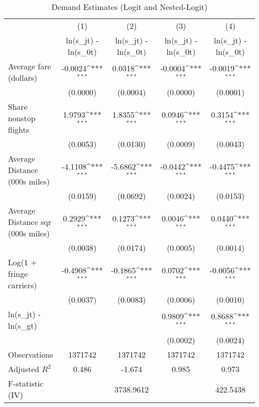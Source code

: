 \begin{table}[htbp]\centering
\def\sym#1{\ifmmode^{#1}\else\(^{#1}\)\fi}
\caption{Demand Estimates (Logit and Nested-Logit)}
\begin{tabular}{l*{4}{c}}
\toprule
                    &\multicolumn{1}{c}{(1)}&\multicolumn{1}{c}{(2)}&\multicolumn{1}{c}{(3)}&\multicolumn{1}{c}{(4)}\\
                    &\multicolumn{1}{c}{ln(s\_jt) - ln(s\_0t)}&\multicolumn{1}{c}{ln(s\_jt) - ln(s\_0t)}&\multicolumn{1}{c}{ln(s\_jt) - ln(s\_0t)}&\multicolumn{1}{c}{ln(s\_jt) - ln(s\_0t)}\\
\midrule
Average fare (dollars)&     -0.0024\sym{***}&      0.0318\sym{***}&     -0.0004\sym{***}&     -0.0019\sym{***}\\
                    &    (0.0000)         &    (0.0004)         &    (0.0000)         &    (0.0001)         \\
\addlinespace
Share nonstop flights &      1.9793\sym{***}&      1.8355\sym{***}&      0.0946\sym{***}&      0.3154\sym{***}\\
                    &    (0.0053)         &    (0.0130)         &    (0.0009)         &    (0.0043)         \\
\addlinespace
Average Distance (000s miles)&     -4.1108\sym{***}&     -5.6862\sym{***}&     -0.0442\sym{***}&     -0.4475\sym{***}\\
                    &    (0.0159)         &    (0.0692)         &    (0.0024)         &    (0.0153)         \\
\addlinespace
Average Distance sqr (000s miles)&      0.2929\sym{***}&      0.1273\sym{***}&      0.0046\sym{***}&      0.0440\sym{***}\\
                    &    (0.0038)         &    (0.0174)         &    (0.0005)         &    (0.0014)         \\
\addlinespace
Log(1 + fringe carriers)&     -0.4908\sym{***}&     -0.1865\sym{***}&      0.0702\sym{***}&     -0.0056\sym{***}\\
                    &    (0.0037)         &    (0.0083)         &    (0.0006)         &    (0.0010)         \\
\addlinespace
ln(s\_jt) - ln(s\_gt) &                     &                     &      0.9809\sym{***}&      0.8688\sym{***}\\
                    &                     &                     &    (0.0002)         &    (0.0024)         \\
\midrule
Observations        &     1371742         &     1371742         &     1371742         &     1371742         \\
Adjusted \(R^{2}\)  &       0.486         &      -1.674         &       0.985         &       0.973         \\
F-statistic (IV)    &                     &   3738.9612         &                     &    422.5438         \\
\bottomrule
\end{tabular}
\end{table}
